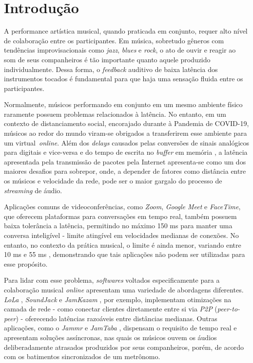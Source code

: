 \chapter{Introdução}

A performance artística musical, quando praticada em conjunto, requer alto nível de colaboração entre os participantes. Em música, sobretudo gêneros com tendências improvisacionais como \textit{jazz}, \textit{blues} e \textit{rock}, o ato de ouvir e reagir ao som de seus companheiros é tão importante quanto aquele produzido individualmente. Dessa forma, o \textit{feedback} auditivo de baixa latência dos instrumentos tocados é fundamental para que haja uma sensação fluida entre os participantes.

Normalmente, músicos performando em conjunto em um mesmo ambiente físico raramente possuem problemas relacionados à latência. No entanto, em um contexto de distanciamento social, encorajado durante à Pandemia de COVID-19, músicos ao redor do mundo viram-se obrigados a transferirem esse ambiente para um virtual \textit{online}. Além dos \textit{delays} causados pelas conversões de sinais analógicos para digitais e vice-versa e do tempo de escrita no \textit{buffer} em memória \cite{how_low_can_you_go}, a latência apresentada pela transmissão de pacotes pela Internet apresenta-se como um dos maiores desafios para sobrepor, onde, a depender de fatores como distância entre os músicos e velocidade da rede, pode ser o maior gargalo do processo de \textit{streaming} de áudio.

Aplicações comuns de videoconferências, como \textit{Zoom}, \textit{Google Meet} e \textit{FaceTime}, que oferecem plataformas para conversações em tempo real, também possuem baixa tolerância a latência, permitindo no máximo 150 ms para manter uma conversa inteligível \cite{cisco} - limite atingível em velocidades medianas de conexões. No entanto, no contexto da prática musical, o limite é ainda menor, variando entre 10 ms e 55 ms \cite{mcphearson}, demonstrando que tais aplicações não podem ser utilizadas para esse propósito. 

Para lidar com esse problema, \textit{softwares} voltados especificamente para a colaboração musical \textit{online} apresentam uma variedade de abordagens diferentes. \textit{LoLa} \cite{lola}, \textit{SoundJack} \cite{soundjack} e \textit{JamKazam} \cite{jamkazam}, por exemplo, implementam otimizações na camada de rede - como conectar clientes diretamente entre si via \textit{P2P} (\textit{peer-to-peer}) - oferecendo latências razoáveis entre distâncias medianas. Outras aplicações, como o \textit{Jammr} \cite{jammr} e \textit{JamTaba} \cite{jamtaba}, dispensam o requisito de tempo real e apresentam soluções assíncronas, nas quais os músicos ouvem os áudios deliberadamente atrasados produzidos por seus companheiros, porém, de acordo com os batimentos sincronizados de um metrônomo.

